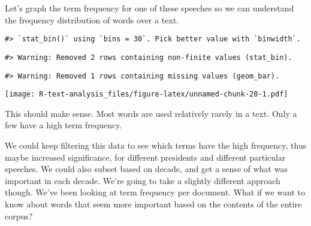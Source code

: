 \documentclass[]{book}
\newenvironment{Shaded}{\begin{snugshade}}{\end{snugshade}}
\newcommand{\DataTypeTok}[1]{\textcolor[rgb]{0.13,0.29,0.53}{#1}}
\newcommand{\FloatTok}[1]{\textcolor[rgb]{0.00,0.00,0.81}{#1}}
\newcommand{\KeywordTok}[1]{\textcolor[rgb]{0.13,0.29,0.53}{\textbf{#1}}}
\newcommand{\NormalTok}[1]{#1}
\newcommand{\OperatorTok}[1]{\textcolor[rgb]{0.81,0.36,0.00}{\textbf{#1}}}
\newcommand{\OtherTok}[1]{\textcolor[rgb]{0.56,0.35,0.01}{#1}}
\newcommand{\StringTok}[1]{\textcolor[rgb]{0.31,0.60,0.02}{#1}}
\begin{document}
\begin{Shaded}
\end{Shaded}

Let's graph the term frequency for one of these speeches so we can understand the frequency distribution of words over a text.

\begin{Shaded}
\end{Shaded}

\begin{verbatim}
#> `stat_bin()` using `bins = 30`. Pick better value with `binwidth`.
\end{verbatim}

\begin{verbatim}
#> Warning: Removed 2 rows containing non-finite values (stat_bin).
\end{verbatim}

\begin{verbatim}
#> Warning: Removed 1 rows containing missing values (geom_bar).
\end{verbatim}

\texttt{[image: R-text-analysis\_files/figure-latex/unnamed-chunk-20-1.pdf]}

This should make sense. Most words are used relatively rarely in a text. Only a few have a high term frequency.

We could keep filtering this data to see which terms have the high frequency, thus maybe increased significance, for different presidents and different particular speeches. We could also subset based on decade, and get a sense of what was important in each decade. We're going to take a slightly different approach though. We've been looking at term frequency per document. What if we want to know about words that seem more important based on the contents of the entire corpus?
\end{document}

